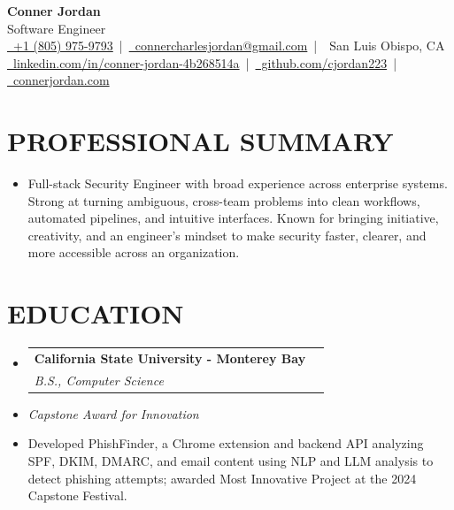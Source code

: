 \documentclass[letterpaper,10pt]{article}
\makeatletter
\newcommand{\resumeSubHeadingListStart}{\begin{itemize}[leftmargin=0in,label={}]}
\newcommand{\resumeSubHeadingListEnd}{\end{itemize}}
\newcommand{\resumeSubheading}[4]{%
  \vspace{-2pt}\item
  \begin{tabular*}{\textwidth}[t]{l@{\extracolsep{\fill}}r}
    \textbf{\large #1} & \textbf{\small #2} \\
    \textit{\large #3} & \textit{\small #4} \\
  \end{tabular*}\vspace{-2pt}
}
\makeatother
\begin{document}
\begin{center}
  {\Huge \textbf{Conner Jordan}}\\[0pt]
  {\Large Software Engineer}\\[0pt]
  \href{tel:+18059759793}{\faPhone\ +1 (805) 975-9793} \,|\, 
  \href{mailto:connercharlesjordan@gmail.com}{\faEnvelope\ connercharlesjordan@gmail.com} \,|\, 
  \faMapMarker\ San Luis Obispo, CA \\[-2pt]
  \href{https://www.linkedin.com/in/conner-jordan-4b268514a/}{\faLinkedin\ linkedin.com/in/conner-jordan-4b268514a}
  \,|\, \href{https://github.com/cjordan223}{\faGithub\ github.com/cjordan223}
  \,|\, \href{https://connerjordan.com/}{\faGlobe\ connerjordan.com}
\end{center}

\vspace{4pt}

\section{PROFESSIONAL SUMMARY}
\vspace{8pt}
\resumeSubHeadingListStart
\item {\small
Full-stack Security Engineer with broad experience across enterprise systems. Strong at turning ambiguous, cross-team problems into clean workflows, automated pipelines, and intuitive interfaces. Known for bringing initiative, creativity, and an engineer's mindset to make security faster, clearer, and more accessible across an organization.
}
\resumeSubHeadingListEnd
\vspace{6pt}

\section{EDUCATION}
\vspace{8pt}
\resumeSubHeadingListStart
  \resumeSubheading
    {California State University - Monterey Bay}{}
    {B.S., Computer Science}{}
  \item {\small \textit{Capstone Award for Innovation }}
  \item {\small Developed PhishFinder, a Chrome extension and backend API analyzing SPF, DKIM, DMARC, and email content using NLP and LLM analysis to detect phishing attempts; awarded Most Innovative Project at the 2024 Capstone Festival.}
\resumeSubHeadingListEnd
\vspace{6pt}

\end{document}
